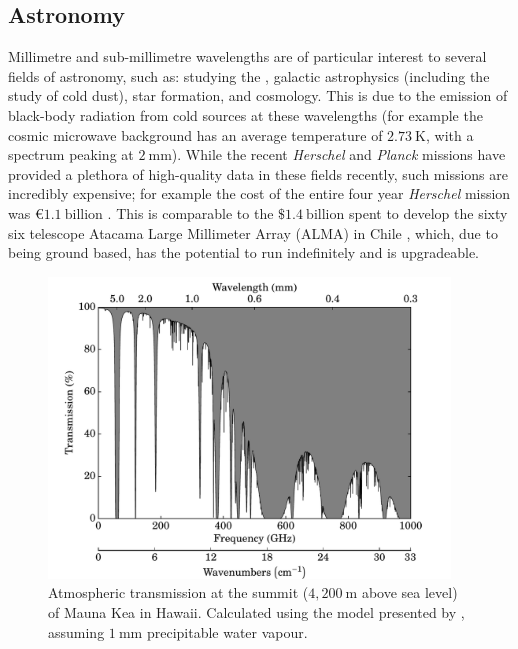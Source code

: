\subsection{Astronomy}
Millimetre and sub-millimetre wavelengths are of particular interest to several fields of astronomy, such as: studying the , galactic astrophysics (including the study of cold dust), star formation, and cosmology. This is due to the emission of black-body radiation from cold sources at these wavelengths (for example the cosmic microwave background has an average temperature of $2.73~\mathrm{K}$, with a spectrum peaking at $2~\mathrm{mm}$). While the recent \textit{Herschel} and \textit{Planck} missions have provided a plethora of high-quality data in these fields recently, such missions are incredibly expensive; for example the cost of the entire four year \textit{Herschel} mission was $\euro{} 1.1~\mathrm{billion}$ \parencite[$\approx \$ 1.2~\mathrm{billion}$;][]{HerschelFactSheet}. This is comparable to the $\$ 1.4~\mathrm{billion}$ spent to develop the sixty six telescope Atacama Large Millimeter Array (ALMA) in Chile \parencite{ESO2013}, which, due to being ground based, has the potential to run indefinitely and is upgradeable.
\begin{figure}[tb]
\begin{center}
\includegraphics[width = 0.95\textwidth]{figures/MaunaKeaTransmission}
\caption[Atmospheric transmission at the summit of Mauna Kea in Hawaii]{Atmospheric transmission at the summit ($4,200~\mathrm{m}$ above sea level) of Mauna Kea in Hawaii. Calculated using the model presented by \textcite{Pardo2001}, assuming $1~\mathrm{mm}$ precipitable water vapour.}
\label{fig:MaunaKeaTransmission}
\end{center}
\end{figure}
